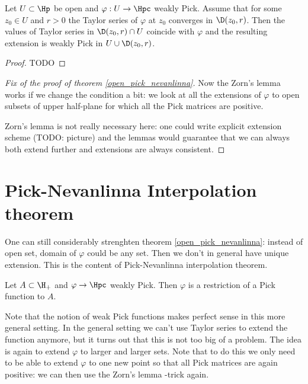 \begin{lem}
	Let $U \subset \Hp$ be open and $\varphi : U \to \Hpc$ weakly Pick. Assume that for some $z_{0} \in U$ and $r > 0$ the Taylor series of $\varphi$ at $z_{0}$ converges in $\D(z_{0}, r)$. Then the values of Taylor series in $\D(z_{0}, r) \cap U$ coincide with $\varphi$ and the resulting extension is weakly Pick in $U \cup \D(z_{0}, r)$.
\end{lem}
\begin{proof}
	TODO
\end{proof}

\begin{proof}[Fix of the proof of theorem \ref{open_pick_nevanlinna}]
Now the Zorn's lemma works if we change the condition a bit: we look at all the extensions of $\varphi$ to open subsets of upper half-plane for which all the Pick matrices are positive.

Zorn's lemma is not really necessary here: one could write explicit extension scheme (TODO: picture) and the lemmas would guarantee that we can always both extend further and extensions are always consistent.
\end{proof}

\section{Pick-Nevanlinna Interpolation theorem}

One can still considerably strenghten theorem \ref{open_pick_nevanlinna}: instead of open set, domain of $\varphi$ could be any set. Then we don't in general have unique extension. This is the content of Pick-Nevanlinna interpolation theorem.

\begin{lause}\label{pick_nevanlinna_interpolation}
	Let $A \subset \H_{+}$ and $\varphi \to \Hpc$ weakly Pick. Then $\varphi$ is a restriction of a Pick function to $A$.
\end{lause}

Note that the notion of weak Pick functions makes perfect sense in this more general setting. In the general setting we can't use Taylor series to extend the function anymore, but it turns out that this is not too big of a problem. The idea is again to extend $\varphi$ to larger and larger sets. Note that to do this we only need to be able to extend $\varphi$ to one new point so that all Pick matrices are again positive: we can then use the Zorn's lemma -trick again.

